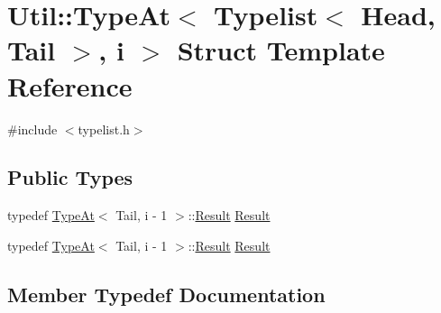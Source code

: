 \hypertarget{structUtil_1_1TL_1_1TypeAt_3_01Typelist_3_01Head_00_01Tail_01_4_00_01i_01_4}{}\section{Util\+:\+:Type\+At$<$ Typelist$<$ Head, Tail $>$, i $>$ Struct Template Reference}
\label{structUtil_1_1TL_1_1TypeAt_3_01Typelist_3_01Head_00_01Tail_01_4_00_01i_01_4}


{\ttfamily \#include $<$typelist.\+h$>$}

\subsection*{Public Types}
\begin{DoxyCompactItemize}
\item 
typedef \mbox{\hyperlink{structUtil_1_1TL_1_1TypeAt}{Type\+At}}$<$ Tail, i -\/ 1 $>$\+::\mbox{\hyperlink{structUtil_1_1TL_1_1TypeAt_3_01Typelist_3_01Head_00_01Tail_01_4_00_01i_01_4_a7ab37564c4bf2d9cfb10c84967788c5c}{Result}} \mbox{\hyperlink{structUtil_1_1TL_1_1TypeAt_3_01Typelist_3_01Head_00_01Tail_01_4_00_01i_01_4_a7ab37564c4bf2d9cfb10c84967788c5c}{Result}}
\item 
typedef \mbox{\hyperlink{structUtil_1_1TL_1_1TypeAt}{Type\+At}}$<$ Tail, i -\/ 1 $>$\+::\mbox{\hyperlink{structUtil_1_1TL_1_1TypeAt_3_01Typelist_3_01Head_00_01Tail_01_4_00_01i_01_4_a7ab37564c4bf2d9cfb10c84967788c5c}{Result}} \mbox{\hyperlink{structUtil_1_1TL_1_1TypeAt_3_01Typelist_3_01Head_00_01Tail_01_4_00_01i_01_4_a7ab37564c4bf2d9cfb10c84967788c5c}{Result}}
\end{DoxyCompactItemize}


\subsection{Member Typedef Documentation}
\mbox{\label{structUtil_1_1TL_1_1TypeAt_3_01Typelist_3_01Head_00_01Tail_01_4_00_01i_01_4_a7ab37564c4bf2d9cfb10c84967788c5c}} 
